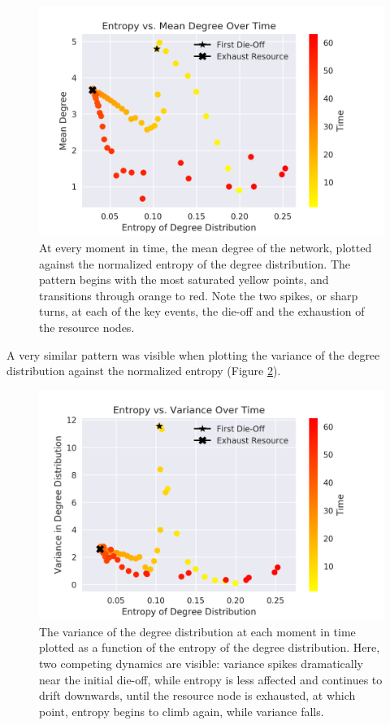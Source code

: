 \documentclass{paper}
\begin{document}
	\begin{figure}[h]
		\centering
		\includegraphics[scale=0.75]{ent_mean_degree.png}
		\caption{At every moment in time, the mean degree of the network, plotted against the normalized entropy of the degree distribution. The pattern begins with the most saturated yellow points, and transitions through orange to red. Note the two spikes, or sharp turns, at each of the key events, the die-off and the exhaustion of the resource nodes.}
		\label{entropy-mean}
	\end{figure}
	
	A very similar pattern was visible when plotting the variance of the degree distribution against the normalized entropy (Figure \ref{entropy-variance}). 
	
	\begin{figure}[h]
		\centering
		\includegraphics[scale=0.75]{ent_var_degree.png}
		\caption{The variance of the degree distribution at each moment in time plotted as a function of the entropy of the degree distribution. Here, two competing dynamics are visible: variance spikes dramatically near the initial die-off, while entropy is less affected and continues to drift downwards, until the resource node is exhausted, at which point, entropy begins to climb again, while variance falls.}
		\label{entropy-variance}
	\end{figure}
	
\end{document}
